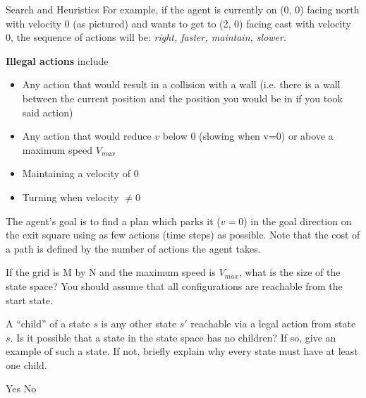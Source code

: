 \begin{problem} {Search and Heuristics}
For example, if the agent is currently on (0, 0) facing north with velocity 0 (as pictured) and wants to get to (2, 0) facing east with velocity 0, the sequence of actions will be: \textit{right, faster, maintain, slower}.

\textbf{Illegal actions} include
\begin{itemize}[noitemsep,topsep=0pt]\vspace{-0.3cm}
    \item Any action that would result in a collision with a wall (i.e. there is a wall between the current position and the position you would be in if you took said action)
    \item Any action that would reduce $v$ below 0 (slowing when v=0) or above a maximum speed $V_{max}$ 
    \item Maintaining a velocity of 0
    \item Turning when velocity $ \neq 0$
\end{itemize}

The agent’s goal is to find a plan which parks it ($v = 0$) in the goal direction on the exit square using as few actions (time steps) as possible. Note that the cost of a path is defined by the number of actions the agent takes.



\begin{question}[3]
If the grid is M by N and the maximum speed is $V_{max}$, what is the size of the state space? You should assume that all configurations are reachable from the start state.

\end{question}

\begin{question}[3]
A “child” of a state $s$ is any other state $s'$ reachable via a legal action from state $s$. Is it possible that a state in the state space has no children? If so, give an example of such a state. If not, briefly explain why every state must have at least one child.

\hspace{5mm}
\solution{\emptycircle}{\OnebYes} Yes
\hspace{5mm}
\solution{\emptycircle}{\OnebNo} No


\end{question}
\end{problem}
